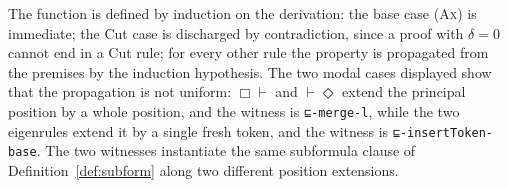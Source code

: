 \documentclass{article}
\theoremstyle{definition}
\begin{document}

\noindent
The function is defined by induction on the derivation: the base case (\textsc{Ax}) is immediate; the Cut case is discharged by contradiction, since a proof with $\delta = 0$ cannot end in a Cut rule; for every other rule the property is propagated from the premises by the induction hypothesis. The two modal cases displayed show that the propagation is not uniform: $\Box\vdash$ and $\vdash\Diamond$ extend the principal position by a whole position, and the witness is \texttt{⊑-merge-l}, while the two eigenrules extend it by a single fresh token, and the witness is \texttt{⊑-insertToken-base}. The two witnesses instantiate the same subformula clause of Definition~\ref{def:subform} along two different position extensions.
\end{document}
